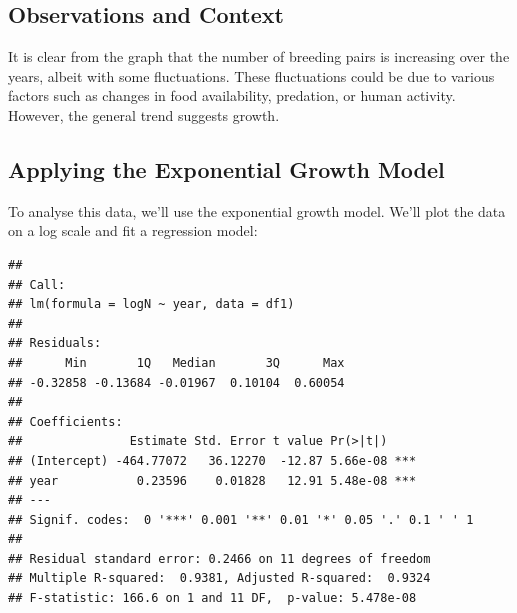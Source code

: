 \documentclass[
  a4paper]{book}
\newenvironment{Shaded}{\begin{snugshade}}{\end{snugshade}}
\newcommand{\AttributeTok}[1]{\textcolor[rgb]{0.13,0.29,0.53}{#1}}
\newcommand{\FunctionTok}[1]{\textcolor[rgb]{0.13,0.29,0.53}{\textbf{#1}}}
\newcommand{\NormalTok}[1]{#1}
\newcommand{\OtherTok}[1]{\textcolor[rgb]{0.56,0.35,0.01}{#1}}
\newcommand{\SpecialCharTok}[1]{\textcolor[rgb]{0.81,0.36,0.00}{\textbf{#1}}}
\begin{document}
\subsection{Observations and Context}\label{observations-and-context}

It is clear from the graph that the number of breeding pairs is increasing over the years, albeit with some fluctuations. These fluctuations could be due to various factors such as changes in food availability, predation, or human activity. However, the general trend suggests growth.

\subsection{Applying the Exponential Growth Model}\label{applying-the-exponential-growth-model}

To analyse this data, we'll use the exponential growth model. We'll plot the data on a log scale and fit a regression model:

\begin{Shaded}
\end{Shaded}

\begin{verbatim}
## 
## Call:
## lm(formula = logN ~ year, data = df1)
## 
## Residuals:
##      Min       1Q   Median       3Q      Max 
## -0.32858 -0.13684 -0.01967  0.10104  0.60054 
## 
## Coefficients:
##               Estimate Std. Error t value Pr(>|t|)    
## (Intercept) -464.77072   36.12270  -12.87 5.66e-08 ***
## year           0.23596    0.01828   12.91 5.48e-08 ***
## ---
## Signif. codes:  0 '***' 0.001 '**' 0.01 '*' 0.05 '.' 0.1 ' ' 1
## 
## Residual standard error: 0.2466 on 11 degrees of freedom
## Multiple R-squared:  0.9381, Adjusted R-squared:  0.9324 
## F-statistic: 166.6 on 1 and 11 DF,  p-value: 5.478e-08
\end{verbatim}
\end{document}
